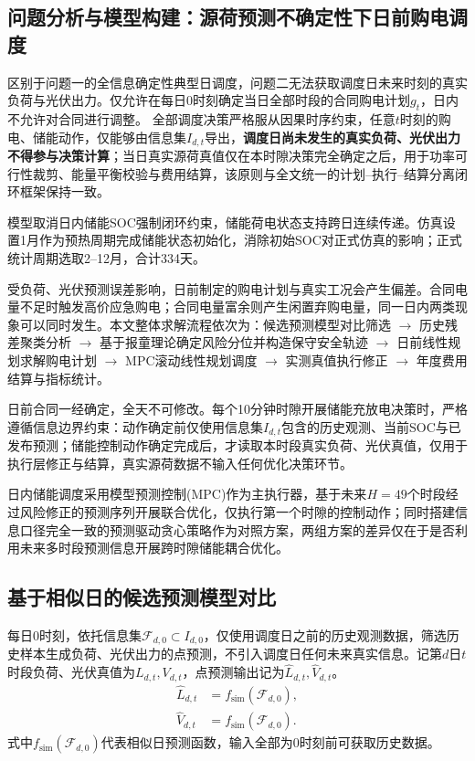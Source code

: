 
\subsection{问题分析与模型构建：源荷预测不确定性下日前购电调度}
区别于问题一的全信息确定性典型日调度，问题二无法获取调度日未来时刻的真实负荷与光伏出力。仅允许在每日0时刻确定当日全部时段的合同购电计划$g_t$，日内不允许对合同进行调整。
全部调度决策严格服从因果时序约束，任意$t$时刻的购电、储能动作，仅能够由信息集$I_{d,t}$导出，\textbf{调度日尚未发生的真实负荷、光伏出力不得参与决策计算}；当日真实源荷真值仅在本时隙决策完全确定之后，用于功率可行性裁剪、能量平衡校验与费用结算，该原则与全文统一的计划--执行--结算分离闭环框架保持一致。

模型取消日内储能SOC强制闭环约束，储能荷电状态支持跨日连续传递。仿真设置1月作为预热周期完成储能状态初始化，消除初始SOC对正式仿真的影响；正式统计周期选取2--12月，合计334天。

受负荷、光伏预测误差影响，日前制定的购电计划与真实工况会产生偏差。合同电量不足时触发高价应急购电；合同电量富余则产生闲置弃购电量，同一日内两类现象可以同时发生。本文整体求解流程依次为：候选预测模型对比筛选 $\rightarrow$ 历史残差聚类分析 $\rightarrow$ 基于报童理论确定风险分位并构造保守安全轨迹 $\rightarrow$ 日前线性规划求解购电计划 $\rightarrow$ MPC滚动线性规划调度 $\rightarrow$ 实测真值执行修正 $\rightarrow$ 年度费用结算与指标统计。

日前合同一经确定，全天不可修改。每个10分钟时隙开展储能充放电决策时，严格遵循信息边界约束：动作确定前仅使用信息集$I_{d,t}$包含的历史观测、当前SOC与已发布预测；储能控制动作确定完成后，才读取本时段真实负荷、光伏真值，仅用于执行层修正与结算，真实源荷数据不输入任何优化决策环节。

日内储能调度采用模型预测控制(MPC)作为主执行器，基于未来$H=49$个时段经过风险修正的预测序列开展联合优化，仅执行第一个时隙的控制动作；同时搭建信息口径完全一致的预测驱动贪心策略作为对照方案，两组方案的差异仅在于是否利用未来多时段预测信息开展跨时隙储能耦合优化。

\subsection{基于相似日的候选预测模型对比}
每日0时刻，依托信息集$\mathcal{F}_{d,0}\subset I_{d,0}$，仅使用调度日之前的历史观测数据，筛选历史样本生成负荷、光伏出力的点预测，不引入调度日任何未来真实信息。记第$d$日$t$时段负荷、光伏真值为$L_{d,t},V_{d,t}$，点预测输出记为$\hat L_{d,t},\hat V_{d,t}$。
\begin{align}
\hat L_{d,t} &= f_{\text{sim}}(\mathcal{F}_{d,0}), \label{eq:q2-lpred}\\
\hat V_{d,t} &= f_{\text{sim}}(\mathcal{F}_{d,0}). \label{eq:q2-vpred}
\end{align}
式中$f_{\text{sim}}(\mathcal{F}_{d,0})$代表相似日预测函数，输入全部为0时刻前可获取历史数据。

